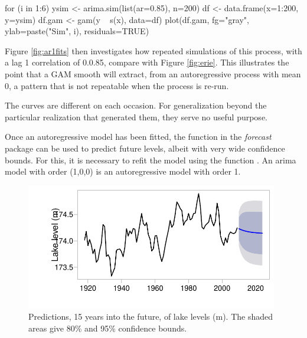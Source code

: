 \begin{marginfigure}[-1.5cm]
\begin{Schunk}
\begin{Sinput}
for (i in 1:6){
ysim <-
  arima.sim(list(ar=0.85),
            n=200)
df <- data.frame(x=1:200,
                 y=ysim)
df.gam <- gam(y ~ s(x),
              data=df)
plot(df.gam, fg="gray",
     ylab=paste("Sim", i),
     residuals=TRUE)
}
\end{Sinput}
\end{Schunk}
\end{marginfigure}

Figure \ref{fig:ar1fits} then investigates how repeated simulations of
this process, with a lag 1 correlation of 0.0.85, compare with Figure
\ref{fig:erie}.  This illustrates the point that a GAM smooth will
extract, from an autoregressive process with mean 0, a pattern that is
not repeatable when the process is re-run.

The curves are different on each occasion.  For generalization beyond
the particular realization that generated them, they serve no useful
purpose.

Once an autoregressive model has been fitted, the function
 in the \textit{forecast} package can be used to
predict future levels, albeit with very wide confidence bounds.
For this, it is necessary to refit the model using the function
. An arima model with order (1,0,0) is an autoregressive
model with order 1.
\vspace*{10pt}

\begin{figure}
\begin{Schunk}


\centerline{\includegraphics[width=0.98\textwidth]{figs/9-Erie-fcast-1} }

\end{Schunk}
\caption{Predictions, 15 years into the future, of lake levels
  (m). The shaded areas give 80\% and 95\% confidence bounds.
}\label{Erie-fcastplot}
\end{figure}

